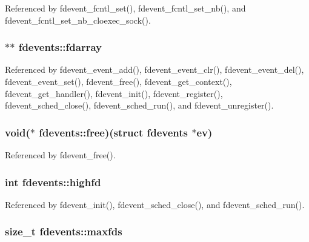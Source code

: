 Referenced by fdevent\-\_\-fcntl\-\_\-set(), fdevent\-\_\-fcntl\-\_\-set\-\_\-nb(), and fdevent\-\_\-fcntl\-\_\-set\-\_\-nb\-\_\-cloexec\-\_\-sock().

\hypertarget{structfdevents_afaf0c3caf9df8add00421fc912e78ad1}{
\subsubsection[{fdarray}]{$\ast$$\ast$ fdevents\-::fdarray}}\label{structfdevents_afaf0c3caf9df8add00421fc912e78ad1}


Referenced by fdevent\-\_\-event\-\_\-add(), fdevent\-\_\-event\-\_\-clr(), fdevent\-\_\-event\-\_\-del(), fdevent\-\_\-event\-\_\-set(), fdevent\-\_\-free(), fdevent\-\_\-get\-\_\-context(), fdevent\-\_\-get\-\_\-handler(), fdevent\-\_\-init(), fdevent\-\_\-register(), fdevent\-\_\-sched\-\_\-close(), fdevent\-\_\-sched\-\_\-run(), and fdevent\-\_\-unregister().

\hypertarget{structfdevents_aad6d8902685c90b08a721c508cb21a8a}{
\subsubsection[{free}]{\setlength{\rightskip}{0pt plus 5cm}void($\ast$ fdevents\-::free)(struct {\bf fdevents} $\ast$ev)}}\label{structfdevents_aad6d8902685c90b08a721c508cb21a8a}


Referenced by fdevent\-\_\-free().

\hypertarget{structfdevents_a93aa999f3be50e2b4316e8a908d78e4c}{
\subsubsection[{highfd}]{\setlength{\rightskip}{0pt plus 5cm}int fdevents\-::highfd}}\label{structfdevents_a93aa999f3be50e2b4316e8a908d78e4c}


Referenced by fdevent\-\_\-init(), fdevent\-\_\-sched\-\_\-close(), and fdevent\-\_\-sched\-\_\-run().

\hypertarget{structfdevents_a02f9df92b0ad5e0c79c36fdb1bc8d0a5}{
\subsubsection[{maxfds}]{\setlength{\rightskip}{0pt plus 5cm}size\-\_\-t fdevents\-::maxfds}}\label{structfdevents_a02f9df92b0ad5e0c79c36fdb1bc8d0a5}


